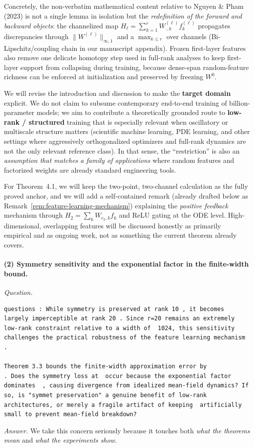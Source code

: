 \documentclass[11pt,a4paper]{article}
\newcommand{\NP}{Nguyen \& Pham (2023)}
\begin{document}
Concretely, the non-verbatim mathematical content relative to \NP{} is not a single lemma in isolation but the \emph{redefinition of the forward and backward objects}: the channelized map $H_\ell=\sum_{k=1}^r W^{(\ell)}_{\cdot,k}f_k^{(\ell)}$ propagates discrepancies through $\|W^{(\ell)}\|_{\infty,1}$ and a $\max_{k\le r}$ over channels (Bi-Lipschitz/coupling chain in our manuscript appendix). Frozen first-layer features also remove one delicate homotopy step used in full-rank analyses to keep first-layer support from collapsing during training, because dense-span random-feature richness can be enforced at initialization and preserved by freezing $W^0$.

We will revise the introduction and discussion to make the \textbf{target domain} explicit. We do not claim to subsume contemporary end-to-end training of billion-parameter models; we aim to contribute a theoretically grounded route to \textbf{low-rank / structured} training that is especially relevant when oscillatory or multiscale structure matters (scientific machine learning, PDE learning, and other settings where aggressively orthogonalized optimizers and full-rank dynamics are not the only relevant reference class). In that sense, the ``restriction'' is also an \emph{assumption that matches a family of applications} where random features and factorized weights are already standard engineering tools.

For Theorem~4.1, we will keep the two-point, two-channel calculation as the fully proved anchor, and we will add a self-contained remark (already drafted below as Remark~\ref{rem:feature-learning-mechanism}) explaining the \emph{positive feedback} mechanism through $H_2=\sum_k W_{c_2,k}f_k$ and ReLU gating at the ODE level. High-dimensional, overlapping features will be discussed honestly as primarily empirical and as ongoing work, not as something the current theorem already covers.

\paragraph{(2) Symmetry sensitivity and the exponential factor in the finite-width bound.}
\textit{Question.}\par
\begin{verbatim}
questions : While symmetry is preserved at rank 10 , it becomes largely imperceptible at rank 20 . Since r=20 remains an extremely low-rank constraint relative to a width of  1024, this sensitivity challenges the practical robustness of the feature learning mechanism .

Theorem 3.3 bounds the finite-width approximation error by 
. Does the symmetry loss at  occur because the exponential factor  dominates  , causing divergence from idealized mean-field dynamics? If so, is "symmet preservation" a genuine benefit of low-rank architectures, or merely a fragile artifact of keeping  artificially small to prevent mean-field breakdown?
\end{verbatim}
\textit{Answer.} We take this concern seriously because it touches both \emph{what the theorems mean} and \emph{what the experiments show}.
\end{document}
